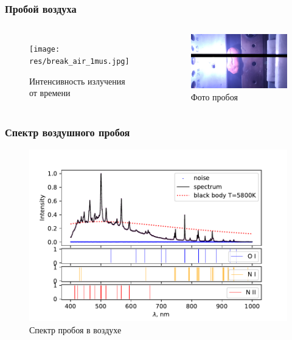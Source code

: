 \documentclass{beamer}
\begin{document}
	\begin{frame}
		\frametitle{Пробой воздуха}
		\begin{columns}
			\begin{figure}
				\centering
				\texttt{[image: res/break\_air\_1mus.jpg]}
				\caption*{Интенсивность излучения от времени}
			\end{figure}	
			\begin{figure}
				\centering
				\includegraphics[width=\linewidth]{res/spark_air.png}
				\caption*{Фото пробоя}
			\end{figure}
		\end{columns}
	\end{frame}	
	
	\begin{frame}
		\frametitle{Спектр воздушного пробоя}
		\begin{figure}
			\centering
			\includegraphics[width=\linewidth]{gen/air_lines.pdf}
			\caption*{Спектр пробоя в воздухе}
		\end{figure}
	\end{frame}
\end{document}

